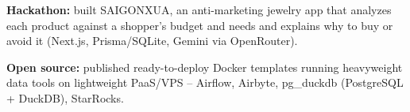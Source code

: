 
\vspace{3pt}
\begin{resume_list}
  \item \textbf{Hackathon:} built SAIGONXUA, an anti-marketing jewelry app that analyzes each product against a shopper's budget and needs and explains why to buy or avoid it (Next.js, Prisma/SQLite, Gemini via OpenRouter).
  \item \textbf{Open source:} published ready-to-deploy Docker templates running heavyweight data tools on lightweight PaaS/VPS -- Airflow, Airbyte, pg\_duckdb (PostgreSQL + DuckDB), StarRocks.
\end{resume_list}
